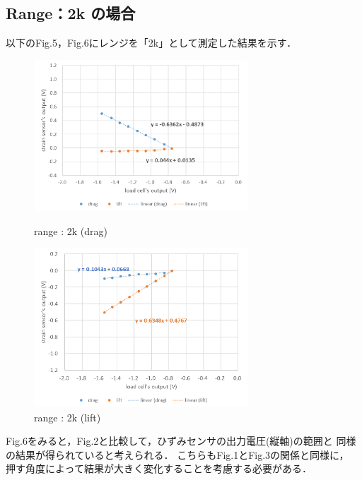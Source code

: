 \documentclass[twocolumn,a4j]{jsarticle}
\begin{document}
\subsection{Range：2k の場合}
以下のFig.5，Fig.6にレンジを「2k」として測定した結果を示す．
\begin{figure}[htbp]
    \footnotesize
    \begin{center}
        \includegraphics[width=80mm]{../images/2k_drag.png}
        \caption{range : 2k (drag)}
        \includegraphics[width=80mm]{../images/2k_lift.png}
        \caption{range : 2k (lift)}
    \end{center}
\end{figure}\par
Fig.6をみると，Fig.2と比較して，ひずみセンサの出力電圧(縦軸)の範囲と
同様の結果が得られていると考えられる．
こちらもFig.1とFig.3の関係と同様に，
押す角度によって結果が大きく変化することを考慮する必要がある．
\newpage
\end{document}
